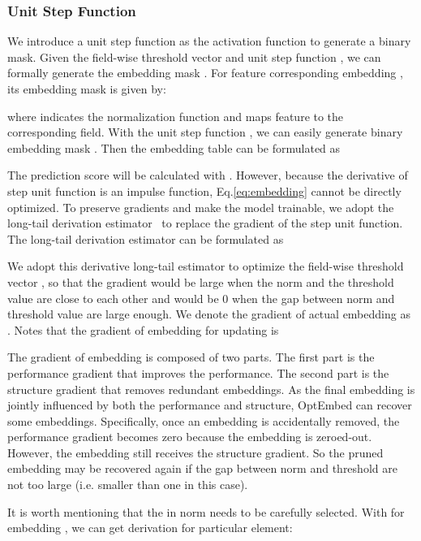 \documentclass[sigconf]{acmart}
\begin{document}
\subsubsection{Unit Step Function}



We introduce a unit step function  as the activation function to generate a binary mask. 
Given the field-wise threshold vector  and unit step function , we can formally generate the embedding mask . For feature  corresponding embedding , its embedding mask  is given by:

where  indicates the  normalization function and  maps feature  to the corresponding field. With the unit step function , we can easily generate binary embedding mask . Then the embedding table can be formulated as


The prediction score will be calculated with . However, because the derivative of step unit function is an impulse function, Eq.\ref{eq:embedding} cannot be directly optimized. To preserve gradients and make the model trainable, we adopt the long-tail derivation estimator~\cite{DST} to replace the gradient  of the step unit function. The long-tail derivation estimator can be formulated as


We adopt this derivative long-tail estimator to optimize the field-wise threshold vector , so that the gradient would be large when the  norm and the threshold value are close to each other and would be 0 when the gap between  norm and threshold value are large enough. We denote the gradient of actual embedding  as . Notes that the gradient of embedding for updating  is 

The gradient of embedding is composed of two parts. The first part  is the performance gradient that improves the performance. The second part  is the structure gradient that removes redundant embeddings. As the final embedding is jointly influenced by both the performance and structure, OptEmbed can recover some embeddings. Specifically, once an embedding is accidentally removed, the performance gradient becomes zero because the embedding is zeroed-out. However, the embedding still receives the structure gradient. So the pruned embedding may be recovered again if the gap between  norm and threshold are not too large (i.e. smaller than one in this case).



It is worth mentioning that the  in  norm needs to be carefully selected. With  for embedding , we can get derivation for particular element:
\end{document}
